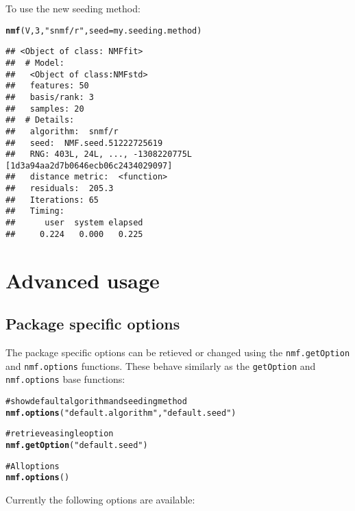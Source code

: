 \documentclass[a4paper]{article}\usepackage{graphicx, color}
\makeatletter
\newcommand{\hlfunctioncall}[1]{\textcolor[rgb]{0.501960784313725,0,0.329411764705882}{\textbf{#1}}}%
\newcommand{\hlstring}[1]{\textcolor[rgb]{0.6,0.6,1}{#1}}%
\newcommand{\hlcomment}[1]{\textcolor[rgb]{0.180392156862745,0.6,0.341176470588235}{#1}}%
\newenvironment{kframe}{%
 \def\at@end@of@kframe{}%
 \ifinner\ifhmode%
  \def\at@end@of@kframe{\end{minipage}}%
  \begin{minipage}{\columnwidth}%
 \fi\fi%
 \def\FrameCommand##1{\hskip\@totalleftmargin \hskip-\fboxsep
 \colorbox{shadecolor}{##1}\hskip-\fboxsep
     \hskip-\linewidth \hskip-\@totalleftmargin \hskip\columnwidth}%
 \MakeFramed {\advance\hsize-\width
   \@totalleftmargin\z@ \linewidth\hsize
   \@setminipage}}%
 {\par\unskip\endMakeFramed%
 \at@end@of@kframe}
\newenvironment{knitrout}{}{} %
\let\code=\texttt
\makeatother
\begin{document}
To use the new seeding method:
\begin{knitrout}
\color{fgcolor}\begin{kframe}
\begin{alltt}
\hlfunctioncall{nmf}(V, 3, \hlstring{"snmf/r"}, seed = my.seeding.method)
\end{alltt}
\begin{verbatim}
## <Object of class: NMFfit>
##  # Model:
##   <Object of class:NMFstd>
##   features: 50 
##   basis/rank: 3 
##   samples: 20 
##  # Details:
##   algorithm:  snmf/r 
##   seed:  NMF.seed.51222725619 
##   RNG: 403L, 24L, ..., -1308220775L [1d3a94aa2d7b0646ecb06c2434029097]
##   distance metric:  <function> 
##   residuals:  205.3 
##   Iterations: 65 
##   Timing:
##      user  system elapsed 
##     0.224   0.000   0.225
\end{verbatim}
\end{kframe}
\end{knitrout}


\section{Advanced usage}

\subsection{Package specific options}
The package specific options can be retieved or changed using the \code{nmf.getOption} and \code{nmf.options} functions. 
These behave similarly as the \code{getOption} and \code{nmf.options} base functions:

\begin{knitrout}
\color{fgcolor}\begin{kframe}
\begin{alltt}
\hlcomment{# show default algorithm and seeding method}
\hlfunctioncall{nmf.options}(\hlstring{"default.algorithm"}, \hlstring{"default.seed"})

\hlcomment{# retrieve a single option}
\hlfunctioncall{nmf.getOption}(\hlstring{"default.seed"})

\hlcomment{# All options}
\hlfunctioncall{nmf.options}()
\end{alltt}
\end{kframe}
\end{knitrout}


Currently the following options are available:
\end{document}
